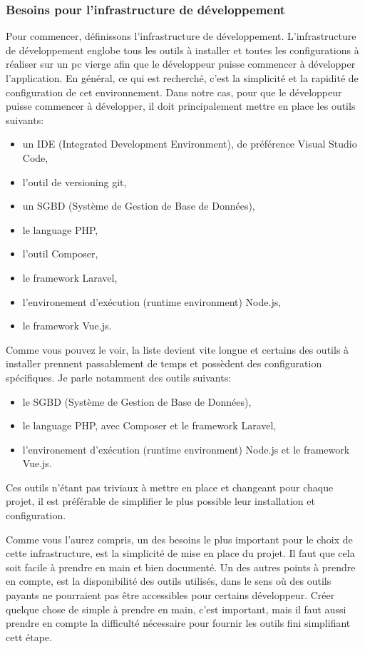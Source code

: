 \documentclass[
    iai, %
    il, %
]{heig-tb}
\begin{document}
\subsubsection{Besoins pour l'infrastructure de développement}
Pour commencer, définissons l'infrastructure de développement.
L'infrastructure de développement englobe tous les outils à installer et toutes les configurations à réaliser sur un pc vierge afin que le développeur puisse commencer à développer l'application.
En général, ce qui est recherché, c'est la simplicité et la rapidité de configuration de cet environnement.
Dans notre cas, pour que le développeur puisse commencer à développer, il doit principalement mettre en place les outils suivants:
\begin{itemize}
    \item un IDE (Integrated Development Environment), de préférence Visual Studio Code,
    \item l'outil de versioning git,
    \item un SGBD (Système de Gestion de Base de Données), %
    \item le language PHP,
    \item l'outil Composer,
    \item le framework Laravel,
    \item l'environement d'exécution (runtime environment) Node.js,
    \item le framework Vue.js.
\end{itemize}
Comme vous pouvez le voir, la liste devient vite longue et certains des outils à installer prennent passablement de temps et possèdent des configuration spécifiques.
Je parle notamment des outils suivants:
\begin{itemize}
    \item le SGBD (Système de Gestion de Base de Données),
    \item le language PHP, avec Composer et le framework Laravel,
    \item l'environement d'exécution (runtime environment) Node.js et le framework Vue.js.
\end{itemize}
Ces outils n'étant pas triviaux à mettre en place et changeant pour chaque projet, il est préférable de simplifier le plus possible leur installation et configuration.

Comme vous l'aurez compris, un des besoins le plus important pour le choix de cette infrastructure, est la simplicité de mise en place du projet.
Il faut que cela soit facile à prendre en main et bien documenté.
Un des autres points à prendre en compte, est la disponibilité des outils utilisés, dans le sens où des outils payants ne pourraient pas être accessibles pour certains développeur.
Créer quelque chose de simple à prendre en main, c'est important, mais il faut aussi prendre en compte la difficulté nécessaire pour fournir les outils fini simplifiant cett étape.
\end{document}
